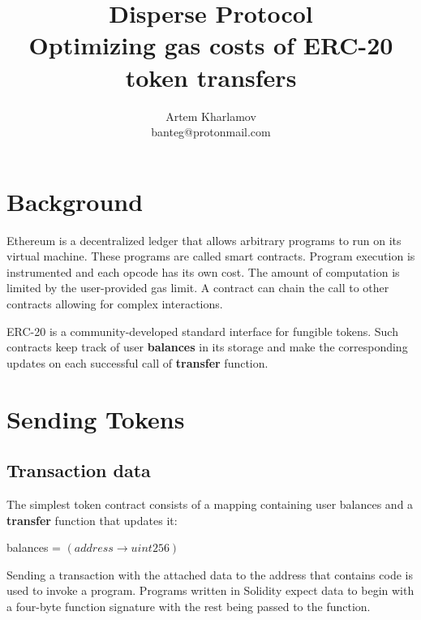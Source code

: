 \documentclass[12pt]{article}
\begin{document}
\title{
	Disperse Protocol\\
	\Large{Optimizing gas costs of ERC-20 token transfers}
}
\author{Artem Kharlamov \\ \small{banteg@protonmail.com}}

\maketitle
{}

\section{Background}
Ethereum is a decentralized ledger that allows arbitrary programs to run on its virtual machine.
These programs are called smart contracts.
Program execution is instrumented and each opcode has its own cost.
The amount of computation is limited by the user-provided gas limit.
A contract can chain the call to other contracts allowing for complex interactions.\cite{ethereum}

ERC-20 is a community-developed standard interface for fungible tokens\cite{eip20}.
Such contracts keep track of user \textbf{balances} in its storage and make the corresponding updates on each successful call of \textbf{transfer} function.

\section{Sending Tokens}
\subsection{Transaction data}
The simplest token contract consists of a mapping containing user balances and a \textbf{transfer} function that updates it:
%
\begin{center}
	balances = $(address \rightarrow uint256)$
\end{center}
%
Sending a transaction with the attached data to the address that contains code is used to invoke a program.
Programs written in Solidity expect data to begin with a four-byte function signature with the rest being passed to the function.
\end{document}
